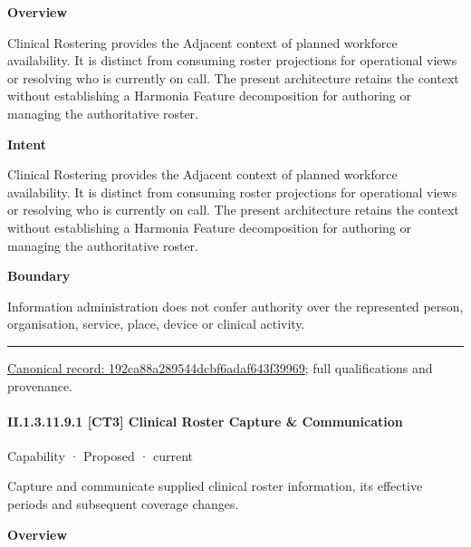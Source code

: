 \textbf{Overview}



Clinical Rostering provides the Adjacent context of planned workforce availability. It is distinct from consuming roster projections for operational views or resolving who is currently on call. The present architecture retains the context without establishing a Harmonia Feature decomposition for authoring or managing the authoritative roster.



\textbf{Intent}



Clinical Rostering provides the Adjacent context of planned workforce availability. It is distinct from consuming roster projections for operational views or resolving who is currently on call. The present architecture retains the context without establishing a Harmonia Feature decomposition for authoring or managing the authoritative roster.



\textbf{Boundary}



Information administration does not confer authority over the represented person, organisation, service, place, device or clinical activity.



\medskip\hrule\medskip

{\footnotesize \href{../../../../continuum/strategy/capability/192ca88a289544dcbf6adaf643f39969.md}{Canonical record: 192ca88a289544dcbf6adaf643f39969}; full qualifications and provenance.}\par
\paragraph*{II.1.3.11.9.1 [CT3] Clinical Roster Capture \& Communication}
\label{navigation:II.1.3.11.9.1}

\label{element:8243cba81fb6449781d10823ae194237}
{\small Capability · Proposed · current}\par

Capture and communicate supplied clinical roster information, its effective periods and subsequent coverage changes.



\textbf{Overview}



